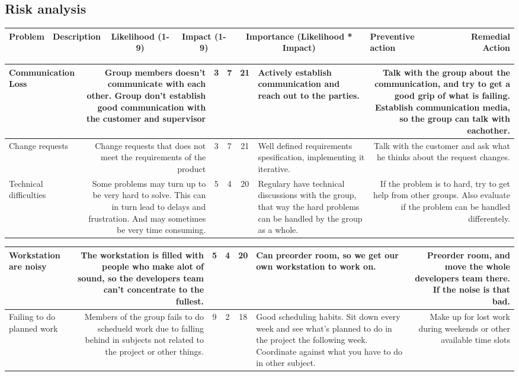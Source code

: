 \documentclass[12pt,a4paper,titlepage]{article}
\begin{document}
				\subsection{Risk analysis}	
					\begin{center}
						\begin{tabulary}{\textwidth}{LRCCCLR} \toprule
Problem & Description & Likelihood (1-9) & Impact (1-9) & Importance (Likelihood * Impact) & Preventive action & Remedial Action \\ \bottomrule
						\end{tabulary}
						\begin{tabulary}{\textwidth}{LRCCCLR} \\
Communication Loss & Group members doesn't communicate with each other. Group don't establish good communication with the customer and supervisor & 3 & 7 & 21 & Actively establish communication and reach out to the parties. & Talk with the group about the communication, and try to get a good grip of what is failing. Establish communication media, so the group can talk with eachother.\\ 
\hline
Change requests & Change requests that does not meet the requirements of the product & 3 & 7 & 21 & Well defined requirements spesification, implementing it iterative. & Talk with the customer and ask what he thinks about the request changes.\\ 
\hline
Technical difficulties
 & Some problems may turn up to be very hard to solve. This can in turn lead to delays and frustration. And may sometimes be very time consuming. & 5 & 4 & 20 & Regulary have technical discussions with the group, that way the hard problems can be handled by the group as a whole.
 & If the problem is to hard, try to get help from other groups. Also evaluate if the problem can be handled differentely.\\ 
\hline
						\end{tabulary}
						\begin{tabulary}{\textwidth}{LRCCCLR} \toprule
Workstation are noisy & The workstation is filled with people who make alot of sound, so the developers team can't concentrate to the fullest. & 5 & 4 & 20 & Can preorder room, so we get our own workstation to work on. & Preorder room, and move the whole developers team there. If the noise is that bad.\\ 
\hline
Failing to do planned work & Members of the group fails to do schedueld work due to falling behind in subjects not related to the project or other things.  & 9 & 2 & 18 & Good scheduling habits. Sit down every week and see what's planned to do in the project the following week. Coordinate against what you have to do in other subject. & Make up for lost work during weekends or other available time slots\\ 

\end{tabulary}
\end{center}
\end{document}
